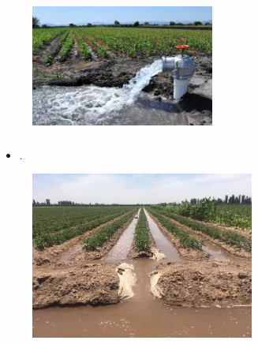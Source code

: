 \begin{frame}
\begin{minipage}{0.6\textwidth}
\begin{itemize}
		\end{itemize}
	\end{minipage}
	\begin{minipage}{0.37\textwidth}
		\begin{figure}[ht!]
			\centering
			\includegraphics[height=4cm]{wasted_water}
		\end{figure}
	\end{minipage}
\end{frame}

\begin{frame}
	\frametitle{\secname}
	\begin{minipage}{0.5\textwidth}
		\begin{itemize}
			\item .
		\end{itemize}
	\end{minipage}
	\begin{minipage}{0.47\textwidth}
		\begin{figure}[ht!]
			\centering
			\includegraphics[height=5.5cm]{water_waster2}
		\end{figure}
	\end{minipage}
\end{frame}

